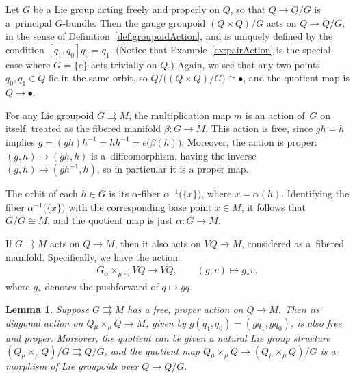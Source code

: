 \documentclass[pdftex]{sigma}
\numberwithin{equation}{section}
\newtheorem{Lemma}[Theorem]{Lemma}
\begin{document}
\begin{Example} Let $G$ be a Lie group acting freely and properly on $Q$, so that $ Q \rightarrow Q / G $ is a~principal $G$-bundle. Then the gauge groupoid $ ( Q \times Q ) / G $ acts on $ Q \rightarrow Q / G $, in the sense of Def\/inition~\ref{def:groupoidAction}, and is uniquely def\/ined by the condition $ [q _1, q _0 ] q _0 = q _1 $. (Notice that Example~\ref{ex:pairAction} is the special case where $ G = \{ e \} $ acts trivially on $Q$.) Again, we see that any two points $ q _0 , q _1 \in Q $ lie in the same orbit, so $ Q / \bigl( ( Q \times Q ) / G \bigr) \cong \bullet $, and the quotient map is $ Q \rightarrow \bullet $.
\end{Example}

\begin{Example} \label{ex:multiplicationAction} For any Lie groupoid $ G \rightrightarrows M $, the multiplication map $m$ is an action of~$G$ on itself, treated as the f\/ibered manifold $ \beta \colon G \rightarrow M $. This action is free, since $ g h = h $ implies $ g = (g h) h ^{-1} = h h ^{-1} = \epsilon \bigl( \beta (h) \bigr) $. Moreover, the action is proper: $( g , h ) \mapsto ( gh , h ) $ is a~dif\/feomorphism, having the inverse $ ( g, h ) \mapsto ( g h ^{-1} , h ) $, so in particular it is a proper map.

The orbit of each $ h \in G $ is its $\alpha$-f\/iber $ \alpha ^{-1} \bigl( \{ x \} \bigr) $, where $ x = \alpha (h) $. Identifying the f\/iber $ \alpha ^{-1} \bigl( \{ x \} \bigr) $ with the corresponding base point $ x \in M $, it follows that $ G / G \cong M $, and the quotient map is just $ \alpha \colon G \rightarrow M $.
\end{Example}

\begin{Example} If $ G \rightrightarrows M $ acts on $ Q \rightarrow M $, then it also acts on $ V Q \rightarrow M $, considered as a~f\/ibered manifold. Specif\/ically, we have the action
 \begin{gather*}
 G \mathbin{ _\alpha \times _{\mu \circ \tau}} V Q \rightarrow V Q , \qquad ( g , v ) \mapsto g _\ast v ,
 \end{gather*}
 where $ g _\ast $ denotes the pushforward of $ q \mapsto gq $.
\end{Example}

\begin{Lemma} \label{lem:quotientGroupoid}
Suppose $ G \rightrightarrows M $ has a free, proper action on $ Q \rightarrow M $. Then its diagonal action on $ Q \mathbin{ _\mu \times _\mu } Q \rightarrow M $, given by $ g ( q _1 , q _0 ) = ( g q _1 , g q _0 ) $, is also free and proper. Moreover, the quotient can be given a natural Lie group
 structure $ ( Q \mathbin{ _\mu \times _\mu } Q ) / G \rightrightarrows Q / G $, and the quotient map $ Q \mathbin{ _\mu \times _\mu } Q \rightarrow ( Q \mathbin{ _\mu \times _\mu } Q ) / G $ is a morphism of Lie groupoids over $ Q \rightarrow Q / G $.
\end{Lemma}
\end{document}

